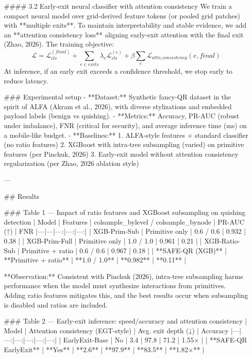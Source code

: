 #### 3.2 Early-exit neural classifier with attention consistency  
We train a compact neural model over grid-derived feature tokens (or pooled grid patches) with **multiple exits**. To maintain interpretability and stable evidence, we add an **attention consistency loss** aligning early-exit attention with the final exit (Zhao, 2026). The training objective:
\[
\mathcal{L} = \mathcal{L}_{cls}^{(final)} + \sum_{e \in exits}\lambda_e \mathcal{L}_{cls}^{(e)} + \beta \sum_{e}\mathcal{L}_{attn\_consistency}(e, final)
\]
At inference, if an early exit exceeds a confidence threshold, we stop early to reduce latency.

### Experimental setup  
- **Dataset:** Synthetic fancy-QR dataset in the spirit of ALFA (Akram et al., 2026), with diverse stylizations and embedded payload labels (benign vs quishing).  
- **Metrics:** Accuracy, PR-AUC (robust under imbalance), FNR (critical for security), and average inference time (ms) on a mobile-like budget.  
- **Baselines:**  
  1. ALFA-style features + standard classifier (no ratio features)  
  2. XGBoost with intra-tree subsampling (varied) on primitive features (per Pinchuk, 2026)  
  3. Early-exit model without attention consistency regularization (per Zhao, 2026 ablation style)

---

## Results  

### Table 1 — Impact of ratio features and XGBoost subsampling on quishing detection  
| Model | Features | colsample_bylevel / colsample_bynode | PR-AUC (↑) | FNR %
|---|---|---:|---:|---:|
| XGB-Prim-Sub | Primitive only | 0.6 / 0.6 | 0.932 | 0.38 |
| XGB-Prim-Full | Primitive only | 1.0 / 1.0 | 0.961 | 0.21 |
| XGB-Ratio-Sub | Primitive + ratio | 0.6 / 0.6 | 0.967 | 0.18 |
| **SAFE-QR (XGB)** | **Primitive + ratio** | **1.0 / 1.0** | **0.982** | **0.11** |

**Observation:** Consistent with Pinchuk (2026), intra-tree subsampling harms performance when the model must synthesize interactions from primitives. Adding ratio features mitigates this, and the best results occur when subsampling is disabled and ratios are included.

### Table 2 — Early-exit inference: speed/accuracy and attention consistency  
| Model | Attention consistency (EGT-style) | Avg. exit depth (↓) | Accuracy %
|---|---:|---:|---:|---:|---:|
| EarlyExit-Base | No | 3.4 | 97.8 | 71.2 | 1.55× |
| **SAFE-QR EarlyExit** | **Yes** | **2.6** | **97.9** | **83.5** | **1.82×** |

